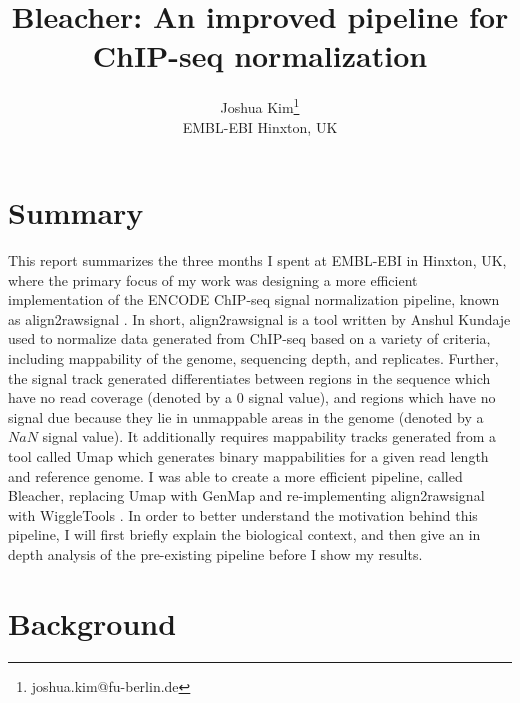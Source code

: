\documentclass[a4paper]{article}
\title{Bleacher: An improved pipeline for ChIP-seq normalization}
\author{Joshua Kim\thanks{joshua.kim@fu-berlin.de}\\EMBL-EBI Hinxton, UK}
\begin{document}
  \maketitle
  \newpage
  \tableofcontents
  \newpage
  \section{Summary}
  This report summarizes the three months I spent at EMBL-EBI in Hinxton, UK, where the primary focus of my work was
  designing a more efficient implementation of the ENCODE ChIP-seq signal normalization pipeline, known as
  align2rawsignal \cite{hoffman_integrative_2013}. In short, align2rawsignal is a tool written by Anshul Kundaje used to
  normalize data generated from ChIP-seq based on a variety of criteria, including mappability of the genome, sequencing depth,
  and replicates. Further, the signal track generated differentiates between regions in the sequence which have no
  read coverage (denoted by a $0$ signal value), and regions which have no signal due because they lie in unmappable areas
  in the genome (denoted by a $NaN$ signal value). It additionally requires mappability tracks generated from a tool
  called Umap \cite{karimzadeh_umap_2018} which generates binary mappabilities for a given read length and reference genome. I was able to
  create a more efficient pipeline, called Bleacher, replacing Umap with GenMap \cite{pockrandt_genmap:_2019} and re-implementing align2rawsignal with
  WiggleTools \cite{zerbino_wiggletools:_2014}. In order to better understand the motivation behind this pipeline, I will first briefly explain the
  biological context, and then give an in depth analysis of the pre-existing pipeline before I show my results.

  \section{Background}
\end{document}
